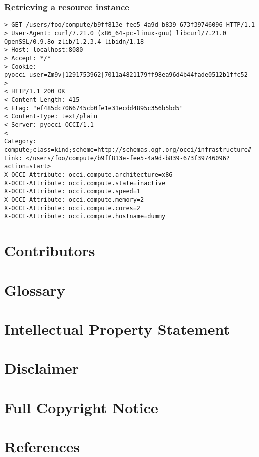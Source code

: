 \documentclass[10pt,a4paper]{article}
\begin{document}
\subsubsection{Retrieving a resource instance}
\begin{verbatim}
> GET /users/foo/compute/b9ff813e-fee5-4a9d-b839-673f39746096 HTTP/1.1
> User-Agent: curl/7.21.0 (x86_64-pc-linux-gnu) libcurl/7.21.0 OpenSSL/0.9.8o zlib/1.2.3.4 libidn/1.18
> Host: localhost:8080
> Accept: */*
> Cookie: pyocci_user=Zm9v|1291753962|7011a4821179ff98ea96d4b44fade0512b1ffc52
> 
< HTTP/1.1 200 OK
< Content-Length: 415
< Etag: "ef485dc7066745cb0fe1e31ecdd4895c356b5bd5"
< Content-Type: text/plain
< Server: pyocci OCCI/1.1
< 
Category: compute;class=kind;scheme=http://schemas.ogf.org/occi/infrastructure#
Link: </users/foo/compute/b9ff813e-fee5-4a9d-b839-673f39746096?action=start>
X-OCCI-Attribute: occi.compute.architecture=x86
X-OCCI-Attribute: occi.compute.state=inactive
X-OCCI-Attribute: occi.compute.speed=1
X-OCCI-Attribute: occi.compute.memory=2
X-OCCI-Attribute: occi.compute.cores=2
X-OCCI-Attribute: occi.compute.hostname=dummy
\end{verbatim}

\section{Contributors}


\section{Glossary}
\label{sec:glossary}


\section{Intellectual Property Statement}


\section{Disclaimer}


\section{Full Copyright Notice}


\section{References}



\end{document}
